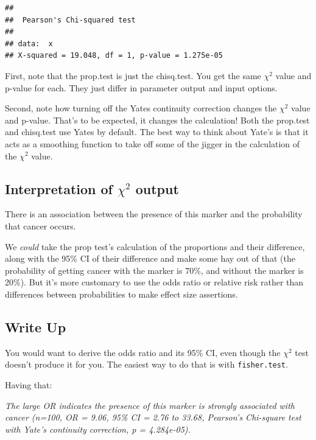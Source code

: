 \documentclass[]{book}
\begin{document}
\begin{verbatim}
## 
##  Pearson's Chi-squared test
## 
## data:  x
## X-squared = 19.048, df = 1, p-value = 1.275e-05
\end{verbatim}

First, note that the prop.test is just the chisq.test. You get the same \(\chi^2\) value and p-value for each. They just differ in parameter output and input options.

Second, note how turning off the Yates continuity correction changes the \(\chi^2\) value and p-value. That's to be expected, it changes the calculation! Both the prop.test and chisq.test use Yates by default. The best way to think about Yate's is that it acts as a smoothing function to take off some of the jigger in the calculation of the \(\chi^2\) value.

\hypertarget{interpretation-of-chi2-output}{%
\subsection{\texorpdfstring{Interpretation of \(\chi^2\) output}{Interpretation of \textbackslash{}chi\^{}2 output}}\label{interpretation-of-chi2-output}}

There is an association between the presence of this marker and the probability that cancer occurs.

We \emph{could} take the prop test's calculation of the proportions and their difference, along with the 95\% CI of their difference and make some hay out of that (the probability of getting cancer with the marker is 70\%, and without the marker is 20\%). But it's more customary to use the odds ratio or relative risk rather than differences between probabilities to make effect size assertions.

\hypertarget{write-up-4}{%
\subsection{Write Up}\label{write-up-4}}

You would want to derive the odds ratio and its 95\% CI, even though the \(\chi^2\) test doesn't produce it for you. The easiest way to do that is with \texttt{fisher.test}.

Having that:

\emph{The large OR indicates the presence of this marker is strongly associated with cancer (n=100, OR = 9.06, 95\% CI = 2.76 to 33.68, Pearson's Chi-square test with Yate's continuity correction, p = 4.284e-05).}
\end{document}
